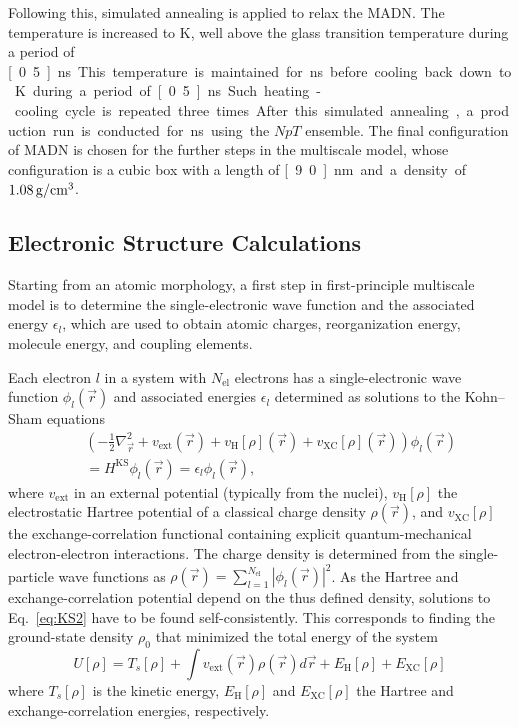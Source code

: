 \documentclass[%
 reprint,
 amsmath,amssymb,
 aps,
]{revtex4-2}
\begin{document}
Following this, simulated annealing is applied to relax the MADN.  
The temperature is increased to \unit[800]{K}, well above the glass transition temperature during a period of \unit[0.5]{ns}. 
This temperature is maintained for \unit[1]{ns} before cooling back down to \unit[300]{K} during a period of \unit[0.5]{ns}.
Such heating-cooling cycle is repeated three times. After this simulated annealing, a production run is conducted for \unit[2]{ns} using the $NpT$ ensemble. The final configuration of MADN is chosen for the further steps in the multiscale model, whose configuration is a cubic box with a length of \unit[9.0]{nm} and a density of $\unit[1.08]{g/cm^3}$. 

\subsection{Electronic Structure Calculations} 
\label{sec:es}
Starting from an atomic morphology, a first step in first-principle multiscale model is to determine the single-electronic wave function and the associated energy $\epsilon_l$, which are used to obtain atomic charges, reorganization energy, molecule energy, and coupling elements.

Each electron $l$ in a system with $N_\text{el}$ electrons has a single-electronic wave function $\phi_l (\vec{r})$ and associated energies $\epsilon_l$ determined as solutions to the Kohn--Sham equations~\cite{kohn_self_1965}
%
\begin{eqnarray}
    && \left(-\frac{1}{2}\nabla^2_{\vec{r}} + v_\text{ext}(\vec{r}) + v_\text{H}[\rho](\vec{r}) + v_\text{XC}[\rho](\vec{r})\right) \phi_l(\vec{r}) \nonumber \\
    && = H^\text{KS} \phi_l(\vec{r}) = \epsilon_l \phi_l (\vec{r}) ,
    \label{eq:KS2}
\end{eqnarray}
%
where $v_\text{ext}$ in an external potential (typically from the nuclei), $v_\text{H}[\rho]$ the electrostatic Hartree potential of a classical charge density $\rho(\vec{r})$, and $v_\text{XC}[\rho]$ the exchange-correlation functional containing explicit quantum-mechanical electron-electron interactions. The charge density is determined from the single-particle wave functions as $\rho(\vec{r})=\sum\limits_{l=1}^{N_\text{el}} \left\vert\phi_l(\vec{r})\right\vert^2$. As the Hartree and exchange-correlation potential depend on the thus defined density, solutions to Eq.~\ref{eq:KS2} have to be found self-consistently. This corresponds to finding the ground-state density $\rho_0$ that minimized the total energy of the system
%
\begin{equation}
    U[\rho] = T_s[\rho] + \int v_\text{ext}(\vec{r}) \rho(\vec{r}) d \vec{r} + E_\text{H}[\rho] + E_\text{XC}[\rho]
    \label{eq:KS_model}
\end{equation}
%
where $T_s[\rho]$ is the kinetic energy, $E_\text{H}[\rho]$ and $E_\text{XC}[\rho]$ the Hartree and exchange-correlation energies, respectively. 
\end{document}
